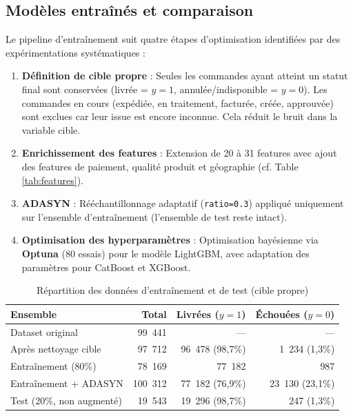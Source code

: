 \documentclass[12pt,a4paper]{report}
\begin{document}
\subsection{Mod\`{e}les entra\^{i}n\'{e}s et comparaison}

Le pipeline d'entra\^{i}nement suit quatre \'{e}tapes d'optimisation identifi\'{e}es par des exp\'{e}rimentations syst\'{e}matiques :

\begin{enumerate}
  \item \textbf{D\'{e}finition de cible propre} : Seules les commandes ayant atteint un statut final sont conserv\'{e}es (livr\'{e}e = $y=1$, annul\'{e}e/indisponible = $y=0$). Les commandes en cours (exp\'{e}di\'{e}e, en traitement, factur\'{e}e, cr\'{e}\'{e}e, approuv\'{e}e) sont exclues car leur issue est encore inconnue. Cela r\'{e}duit le bruit dans la variable cible.
  \item \textbf{Enrichissement des features} : Extension de 20 \`{a} 31 features avec ajout des features de paiement, qualit\'{e} produit et g\'{e}ographie (cf. Table \ref{tab:features}).
  \item \textbf{ADASYN} : R\'{e}\'{e}chantillonnage adaptatif (\texttt{ratio=0.3}) appliqu\'{e} uniquement sur l'ensemble d'entra\^{i}nement (l'ensemble de test reste intact).
  \item \textbf{Optimisation des hyperparam\`{e}tres} : Optimisation bay\'{e}sienne via \textbf{Optuna} (80 essais) pour le mod\`{e}le LightGBM, avec adaptation des param\`{e}tres pour CatBoost et XGBoost.
\end{enumerate}

\begin{table}[H]
\centering
\caption{R\'{e}partition des donn\'{e}es d'entra\^{i}nement et de test (cible propre)}
\label{tab:split}
\begin{tabularx}{\textwidth}{l r r r}
\toprule
\textbf{Ensemble} & \textbf{Total} & \textbf{Livr\'{e}es ($y=1$)} & \textbf{\'{E}chou\'{e}es ($y=0$)} \\
\midrule
Dataset original & 99~441 & --- & --- \\
Apr\`{e}s nettoyage cible & 97~712 & 96~478 (98,7\%) & 1~234 (1,3\%) \\
Entra\^{i}nement (80\%) & 78~169 & 77~182 & 987 \\
Entra\^{i}nement + ADASYN & 100~312 & 77~182 (76,9\%) & 23~130 (23,1\%) \\
Test (20\%, non augment\'{e}) & 19~543 & 19~296 (98,7\%) & 247 (1,3\%) \\
\bottomrule
\end{tabularx}
\end{table}
\end{document}
